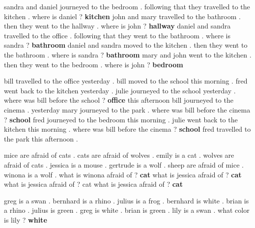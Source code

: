 \begin{table}[htb!]
\begin{tcbraster}[raster columns=2, size=minimal, raster valign=top]
     \begin{tcolorbox}[mybox, title=Task 13: Compound conference] 
    \tiny
    sandra and daniel journeyed to the bedroom . following that they travelled to the kitchen . where is daniel ? \textbf{kitchen} john and mary travelled to the bathroom . then they went to the hallway . where is john ? \textbf{hallway} daniel and sandra travelled to the office . following that they went to the bathroom . where is sandra ? \textbf{bathroom} daniel and sandra moved to the kitchen . then they went to the bathroom . where is sandra ? \textbf{bathroom} mary and john went to the kitchen . then they went to the bedroom . where is john ?\textbf{ bedroom}
    \end{tcolorbox}  
    \begin{tcolorbox}[mybox, title=Task 14: Time reasoning] 
    \tiny
    bill travelled to the office yesterday . bill moved to the school this morning . fred went back to the kitchen yesterday . julie journeyed to the school yesterday . where was bill before the school ? \textbf{office} this afternoon bill journeyed to the cinema . yesterday mary journeyed to the park . where was bill before the cinema ? \textbf{school} fred journeyed to the bedroom this morning . julie went back to the kitchen this morning . where was bill before the cinema ? \textbf{school} fred travelled to the park this afternoon . 
    \end{tcolorbox}    
    \begin{tcolorbox}[mybox, title=Task 15: Basic deduction] 
    \tiny
    mice are afraid of cats . cats are afraid of wolves . emily is a cat . wolves are afraid of cats . jessica is a mouse . gertrude is a wolf . sheep are afraid of mice . winona is a wolf . what is winona afraid of ? \textbf{cat} what is jessica afraid of ? \textbf{cat} what is jessica afraid of ? cat what is jessica afraid of ? \textbf{cat}
    \end{tcolorbox}  
    \begin{tcolorbox}[mybox, title=Task 16: Basic induction] 
    \tiny
 greg is a swan . bernhard is a rhino . julius is a frog . bernhard is white . brian is a rhino . julius is green . greg is white . brian is green . lily is a swan . what color is lily ? \textbf{white}
    \end{tcolorbox}    
    \begin{tcolorbox}[mybox, title=Task 17: Positional reasoning] 

\end{tcolorbox}
\end{tcbraster}
\end{table}
